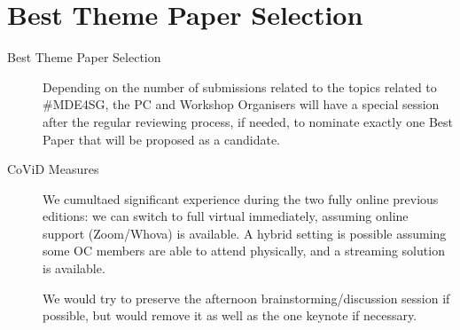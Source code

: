 \section{Best Theme Paper Selection}
\label{sec:Best}

\begin{description}
   \item[Best Theme Paper Selection] Depending on the number of submissions 
   related to the topics related to \#MDE4SG, the PC and Workshop Organisers 
   will have a special session after the regular reviewing process, if needed, 
   to nominate exactly one Best Paper that will be proposed as a candidate. 

   \item[CoViD Measures] We cumultaed significant experience during the two 
   fully online previous editions: we can switch to full virtual immediately,
   assuming online support (Zoom/Whova) is available. A hybrid setting is 
   possible assuming some OC members are able to attend physically, and a streaming
   solution is available.
   
   We would try to preserve the afternoon brainstorming/discussion session if possible,
   but would remove it as well as the one keynote if necessary. 
\end{description}

